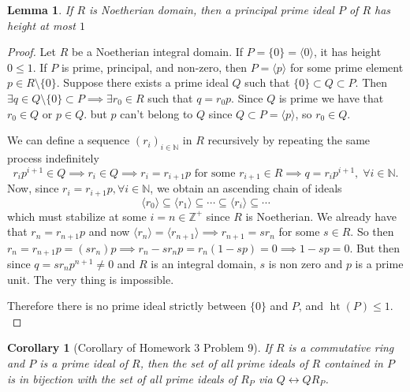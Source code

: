 \documentclass[addpoints,10pt]{exam}
\theoremstyle{plain}
\theoremstyle{definition}
\theoremstyle{plain}
\theoremstyle{plain}
\newtheorem{lem}[thm]{Lemma}
\newtheorem{cor}[thm]{Corollary}
\theoremstyle{definition}
\newcommand{\NN}{\ensuremath{\mathbb{N}}}
\newcommand{\ZZ}{\ensuremath{\mathbb{Z}}}
\begin{document}
\newpage
\begin{lem}\label{lem:NoP}
    If $R$ is Noetherian domain, then a principal prime ideal $P$ of $R$ has height at most $1$
\end{lem}
\begin{proof}
Let $R$ be a Noetherian integral domain. If $P=\{0\}=\langle 0\rangle$, it has height $0\leq 1$. If $P$ is prime, principal, and non-zero, then $P=\langle p\rangle$ for some prime element $p\in R\setminus\{0\}$. Suppose there exists a prime ideal $Q$ such that $\{0\}\subset Q\subset P.$ Then $\exists q\in Q\setminus\{0\}\subset P\implies \exists r_{0}\in R$ such that $q=r_{0}p$. Since $Q$ is prime we have that $r_{0}\in Q \text{ or } p\in Q.$  but $p$ can't belong to $Q$ since $Q\subset P=\langle p\rangle$, so $r_{0}\in Q$.

We can define a sequence $(r_{i})_{i\in \NN}$ in $R$ recursively by repeating the same process indefinitely
$$r_{i}p^{i+1}\in Q\implies r_{i}\in Q\implies r_{i}=r_{i+1}p\text{ for some }r_{i+1}\in R\implies q=r_{i}p^{i+1},\;\forall i\in \NN.$$
Now, since $r_{i}=r_{i+1}p,\forall i\in\NN$, we obtain an ascending chain of ideals
$$ 
\langle r_{0}\rangle \subseteq \langle r_{1}\rangle \subseteq \cdots \subseteq \langle r_{i}\rangle \subseteq \cdots
$$
which must stabilize at some $i=n\in \ZZ^{+}$ since $R$ is Noetherian. We already have that $r_{n}=r_{n+1}p$ and now $\langle r_{n}\rangle=\langle r_{n+1}\rangle\implies r_{n+1}=sr_{n}$ for some $s\in R$. So then $r_{n}=r_{n+1}p=(sr_{n})p\implies r_{n}-sr_{n}p=r_{n}(1-sp)=0\implies 1-sp=0.$ But then since $q=sr_{n}p^{n+1}\neq 0$ and $R$ is an integral domain, $s$ is non zero and $p$ is a prime unit. The very thing is impossible.

Therefore there is no prime ideal strictly between $\{0\}$ and $P$, and $\operatorname{ht}(P)\leq 1.$

\end{proof}
\begin{cor}[Corollary of Homework 3 Problem 9]\label{cor:localprime}
    If $R$ is a commutative ring and $P$ is a prime ideal of $R$, then the set of all prime ideals of $R$ contained in $P$ is in bijection with the set of all prime ideals of $R_{P}$ via $Q\longleftrightarrow QR_{P}$.
\end{cor}
\end{document}
